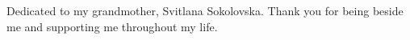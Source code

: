
\null\vskip5cm%
\begin{flushright}
     Dedicated to my grandmother, Svitlana Sokolovska. Thank you for being beside me and supporting me throughout my life.
\end{flushright}
\vfill\newpage

